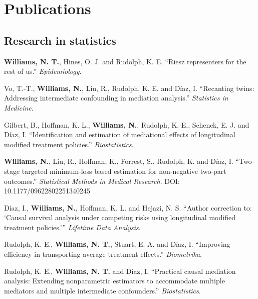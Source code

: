 \documentclass[12pt,letterpaper]{report}
\begin{document}
    \section*{Publications}
    
    \subsection*{Research in statistics}
    
    \begin{tablist}
    
        \item[2026] \tab \textbf{Williams, N. T.}, Hines, O. J. and Rudolph, K. E. \enquote{Riesz representers for the rest of us.} \textit{Epidemiology}.
        
        \item[2026] \tab Vo, T.-T., \textbf{Williams, N.}, Liu, R., Rudolph, K. E. and Díaz, I. \enquote{Recanting twins: Addressing intermediate confounding in mediation analysis.} \textit{Statistics in Medicine}. 
        
            \item[2024] \tab Gilbert, B., Hoffman, K. L., \textbf{Williams, N.}, Rudolph, K. E., Schenck, E. J. and Díaz, I. \enquote{Identification and estimation of mediational effects of longitudinal modified treatment policies.} \textit{Biostatistics}.
   
    \item[2025] \tab \textbf{Williams, N.}, Liu, R., Hoffman, K., Forrest, S., Rudolph, K. and Díaz, I. \enquote{Two-stage targeted minimum-loss based estimation for non-negative two-part outcomes.} \textit{Statistical Methods in Medical Research}. DOI: 10.1177/09622802251340245
    
    \item[2025] \tab Díaz, I., \textbf{Williams, N.}, Hoffman, K. L. and Hejazi, N. S. \enquote{Author correction to: `Causal survival analysis under competing risks using longitudinal modified treatment policies.'} \textit{Lifetime Data Analysis}.
    
    \item[2025] \tab Rudolph, K. E., \textbf{Williams, N. T.}, Stuart, E. A. and Díaz, I. \enquote{Improving efficiency in transporting average treatment effects.} \textit{Biometrika}.
    
    \item[2024] \tab Rudolph, K. E., \textbf{Williams, N. T.} and Díaz, I. \enquote{Practical causal mediation analysis: Extending nonparametric estimators to accommodate multiple mediators and multiple intermediate confounders.} \textit{Biostatistics}.
    

\end{tablist}
\end{document}
